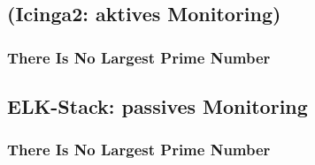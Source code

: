 \documentclass[10pt]{beamer} %
\begin{document}
\subsection{(Icinga2: aktives Monitoring)}
\begin{frame}
\frametitle{There Is No Largest Prime Number}

\end{frame}


\subsection{ELK-Stack: passives Monitoring}
\begin{frame}
\frametitle{There Is No Largest Prime Number}

\end{frame}
\end{document}
